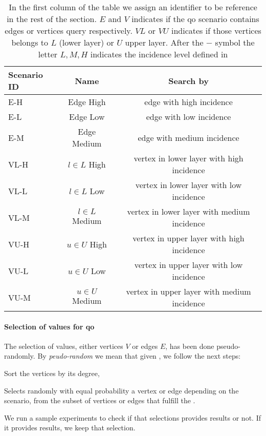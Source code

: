 \begin{table}[H]
  \centering
  \begin{tabular}{|l|c|c|}
    \hline
    \textbf{Scenario ID} & \textbf{Name} & \textbf{Search by}\\
    \hline
    E-H & Edge High & edge with high incidence \\
    \hline
    E-L & Edge Low & edge with low incidence \\
    \hline
    E-M & Edge Medium & edge with medium incidence \\
    \hline
    VL-H & $l \in L$ High & vertex in lower layer with high incidence \\
    \hline
    VL-L & $l \in L$ Low & vertex in lower layer with low incidence \\
    \hline
    VL-M & $l \in L$ Medium & vertex in lower layer with medium incidence \\
    \hline
    VU-H & $u \in U$ High & vertex in upper layer with high incidence \\
    \hline
    VU-L & $u \in U$ Low & vertex in upper layer with low incidence \\
    \hline
    VU-M & $u \in U$ Medium & vertex in upper layer with medium incidence \\
    \hline
  \end{tabular}
  \caption[{[EE] Experiment Data Setup for experiments}]{In the first column of the table we assign an identifier to be reference in the rest of the section. $E$ and $V$ indicates if the \acrshort{qo} scenario contains edges or vertices query respectively. $VL$ or $VU$ indicates if those vertices belongs to $L$ (lower layer) or $U$ upper layer. After the $-$ symbol the letter $L,M,H$ indicates the incidence level defined in }
  \label{table:exp:data-setup}
  \end{table}

\paragraph{Selection of values for \acrshort{qo}}\label{sub:exp:sel-vals} The selection of values, either vertices $V$ or edges $E$, has been done pseudo-randomly.
By \emph{peudo-random} we mean that given , we follow the next steps: \begin{inparaenum}[\bf i\upshape)]
  \item Sort the vertices by its degree,
  \item Selects randomly with equal probability a vertex or edge depending on the scenario, from the subset of vertices or edges that fulfill the .
  \item We run a sample experiments to check if that selections provides results or not. If it provides results, we keep that selection.
\end{inparaenum}
  
